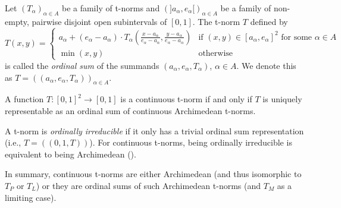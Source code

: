 \begin{definition}
Let $(T_\alpha)_{\alpha \in A}$ be a family of t-norms and $(]a_\alpha, e_\alpha[)_{\alpha \in A}$ be a family of non-empty, pairwise disjoint open subintervals of $[0,1]$. The t-norm $T$ defined by
\[
T(x,y) =
\begin{cases}
  a_\alpha + (e_\alpha - a_\alpha) \cdot T_\alpha \left( \frac{x-a_\alpha}{e_\alpha - a_\alpha}, \frac{y-a_\alpha}{e_\alpha - a_\alpha} \right) & \text{if } (x,y) \in [a_\alpha, e_\alpha]^2 \text{ for some } \alpha \in A \\
  \min(x,y) & \text{otherwise}
\end{cases}
\]
is called the \emph{ordinal sum} of the summands $(a_\alpha, e_\alpha, T_\alpha)$, $\alpha \in A$.
We denote this as $T = ((a_\alpha, e_\alpha, T_\alpha))_{\alpha \in A}$.
\end{definition}

\begin{theorem}
  A function $T: [0,1]^2 \to [0,1]$ is a continuous t-norm if and only if $T$ is uniquely representable as an ordinal sum of continuous Archimedean t-norms.
\end{theorem}

\begin{remark}
  A t-norm is \emph{ordinally irreducible} if it only has a trivial ordinal sum representation (i.e., $T = ((0,1,T))$). For continuous t-norms, being ordinally irreducible is equivalent to being Archimedean (\citep[Proposition 3.53, p.~99]{Klement2000}).
\end{remark}

In summary, continuous t-norms are either Archimedean (and thus isomorphic to $T_P$ or $T_L$) or they are ordinal sums of such Archimedean t-norms (and $T_M$ as a limiting case).





